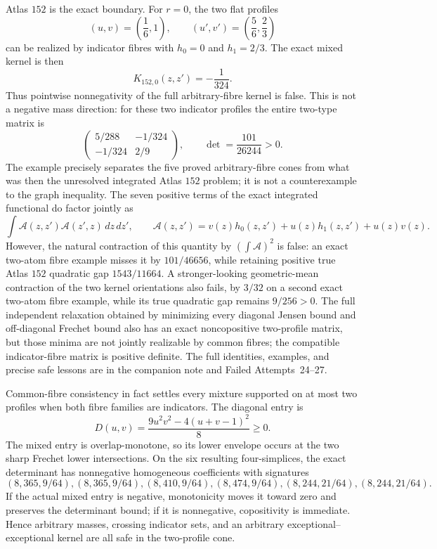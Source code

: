 \documentclass[11pt]{article}
\begin{document}
Atlas $152$ is the exact boundary.  For $r=0$, the two flat profiles
\[
 (u,v)=\left(\frac16,1\right),
 \qquad
 (u',v')=\left(\frac56,\frac23\right)
\]
can be realized by indicator fibres with
$h_0=0$ and $h_1=2/3$.  The exact mixed kernel is then
\[
 K_{152,0}(z,z')=-\frac1{324}.
\]
Thus pointwise nonnegativity of the full arbitrary-fibre kernel is false.
This is not a negative mass direction: for these two indicator profiles the
entire two-type matrix is
\[
 \begin{pmatrix}
  5/288&-1/324\\
  -1/324&2/9
 \end{pmatrix},
 \qquad
 \det=\frac{101}{26244}>0.
\]
The example precisely separates the five proved arbitrary-fibre cones from
what was then the unresolved integrated Atlas $152$ problem; it is not a counterexample to
the graph inequality.  The seven positive terms of the exact integrated
functional do factor jointly as
\[
 \int \mathcal A(z,z')\mathcal A(z',z)\,dz\,dz',
 \qquad
 \mathcal A(z,z')=v(z)h_0(z,z')+u(z)h_1(z,z')+u(z)v(z).
\]
However, the natural contraction of this quantity by
$(\int\mathcal A)^2$ is false: an exact two-atom fibre example misses it by
$101/46656$, while retaining positive true Atlas $152$ quadratic gap
$1543/11664$.  A stronger-looking geometric-mean contraction of the two
kernel orientations also fails, by $3/32$ on a second exact two-atom fibre
example, while its true quadratic gap remains $9/256>0$.  The full
independent relaxation obtained by minimizing every diagonal Jensen bound
and off-diagonal Frechet bound also has an exact noncopositive two-profile
matrix, but those minima are not jointly realizable by common fibres; the
compatible indicator-fibre matrix is positive definite.  The full
identities, examples, and precise safe lessons are in the companion note
and Failed Attempts~24--27.

Common-fibre consistency in fact settles every mixture supported on at most
two profiles when both fibre families are indicators.  The diagonal entry is
\[
 D(u,v)=\frac{9u^2v^2-4(u+v-1)^2}{8}\geq0.
\]
The mixed entry is overlap-monotone, so its lower envelope occurs at the two
sharp Frechet lower intersections.  On the six resulting four-simplices,
the exact determinant has nonnegative homogeneous coefficients with
signatures
\[
 (8,365,9/64),(8,365,9/64),(8,410,9/64),
 (8,474,9/64),(8,244,21/64),(8,244,21/64).
\]
If the actual mixed entry is negative, monotonicity moves it toward zero and
preserves the determinant bound; if it is nonnegative, copositivity is
immediate.  Hence arbitrary masses, crossing indicator sets, and an arbitrary
exceptional--exceptional kernel are all safe in the two-profile cone.
\end{document}
